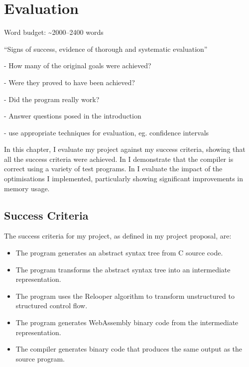 \documentclass[00-main.tex]{subfiles}
\begin{document}
\chapter{Evaluation}

\newcommand{\IncludeStackPlot}[1]{\resizebox{0.98\textwidth}{!}{}}

\begin{mrwComment}
Word budget: \textasciitilde 2000--2400 words
\end{mrwComment}

\begin{mrwComment}
``Signs of success, evidence of thorough and systematic evaluation''

- How many of the original goals were achieved?

- Were they proved to have been achieved?

- Did the program really work?

- Answer questions posed in the introduction

- use appropriate techniques for evaluation, eg. confidence intervals
\end{mrwComment}


In this chapter, I evaluate my project against my success criteria, showing that all the success criteria were achieved.
In  I demonstrate that the compiler is correct using a variety of test programs.
In  I evaluate the impact of the optimisations I implemented, particularly showing significant improvements in memory usage.


\section{Success Criteria}

The success criteria for my project, as defined in my project proposal, are:
\begin{itemize}
\item The program generates an abstract syntax tree from C source code.
\item The program transforms the abstract syntax tree into an intermediate representation.
\item The program uses the Relooper algorithm to transform unstructured to structured control
flow.
\item The program generates WebAssembly binary code from the intermediate representation.
\item The compiler generates binary code that produces the same output as the source program.
\end{itemize}
\end{document}
